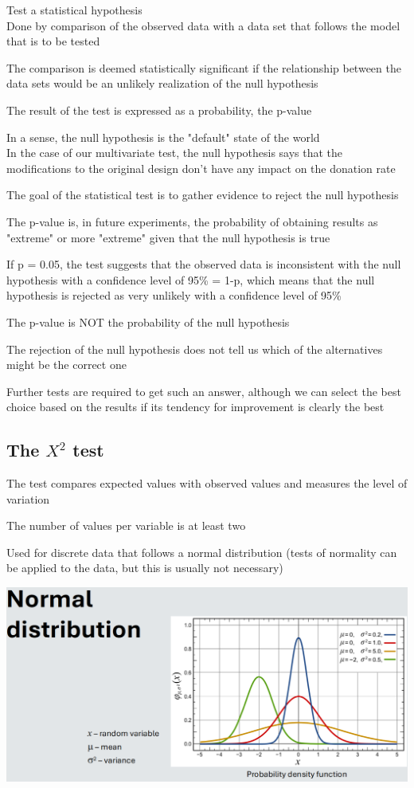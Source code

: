 \documentclass[]{project_plan}
\begin{document}
Test a statistical hypothesis\\
Done by comparison of the observed data with a data set that follows the model that is to be tested

The comparison is deemed statistically significant if the relationship between the
data sets would be an unlikely realization of the null hypothesis

The result of the test is expressed as a probability, the p-value

In a sense, the null hypothesis is the "default" state of the world\\
In the case of our multivariate test, the null hypothesis says that the modifications to the
original design don't have any impact on the donation rate

The goal of the statistical test is to gather evidence to reject the null hypothesis

The p-value is, in future experiments, the probability of obtaining results as "extreme"
or more "extreme" given that the null hypothesis is true

If p = 0.05, the test suggests that the observed data is inconsistent with the null
hypothesis with a confidence level of 95\% = 1-p, which means that the null hypothesis is
rejected as very unlikely with a confidence level of 95\%

The p-value is NOT the probability of the null
hypothesis

The rejection of the null hypothesis does not
tell us which of the alternatives might be the
correct one

Further tests are required to get such an
answer, although we can select the best
choice based on the results if its tendency for
improvement is clearly the best

\subsection{The $X^2$ test}

The test compares expected values with observed
values and measures the level of variation

The number of values per variable is at least
two

Used for discrete data that follows a normal
distribution (tests of normality can be
applied to the data, but this is usually not
necessary)

\includegraphics[width=\linewidth]{normal_distribution.png}
\end{document}
